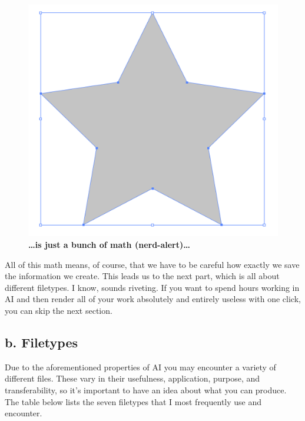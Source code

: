 \documentclass[]{article}
\begin{document}
\begin{figure}
\centering
\includegraphics{Star2.png}
\caption{\textbf{\ldots{}is just a bunch of math (nerd-alert)\ldots{}}}
\end{figure}

All of this math means, of course, that we have to be careful how
exactly we save the information we create. This leads us to the next
part, which is all about different filetypes. I know, sounds riveting.
If you want to spend hours working in AI and then render all of your
work absolutely and entirely useless with one click, you can skip the
next section.

\subsection{b. Filetypes}\label{b.-filetypes}

Due to the aforementioned properties of AI you may encounter a variety
of different files. These vary in their usefulness, application,
purpose, and transferability, so it's important to have an idea about
what you can produce. The table below lists the seven filetypes that I
most frequently use and encounter.
\end{document}
